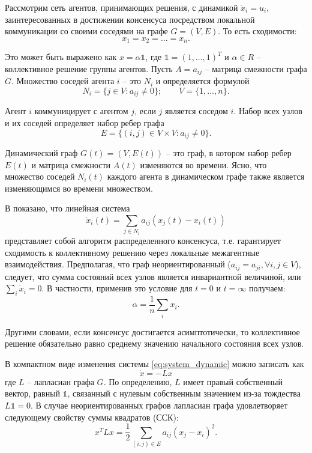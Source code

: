 \documentclass[a4paper,article,14pt]{extarticle}
\begin{document}
Рассмотрим сеть агентов, принимающих решения, с динамикой $\dot x_i = u_i$, заинтересованных в достижении консенсуса посредством локальной коммуникации со своими соседями на графе $G = (V, E)$.
То есть сходимости:
\begin{equation}
x_1 = x_2 = \ldots = x_n.
\end{equation}

Это может быть выражено как $x = \alpha \mathds{1} $, где $\mathds{1} = (1, \ldots, 1)^T$ и $\alpha \in R$ -- коллективное решение группы агентов. Пусть $A = a_{ij}$ -- матрица смежности графа $G$. Множество соседей агента $i$ -- это $N_i$ и определяется формулой
\begin{equation}
N_i = \{ j \in V: a_{ij} \ne 0 \}; \quad \quad V = \{1, \ldots, n\}.
\end{equation}

Агент $i$ коммуницирует с агентом $j$, если $j$ является соседом $i$. Набор всех узлов и их соседей определяет набор ребер графа
\begin{equation}
E = \{ (i,j) \in V\times V: a_{ij} \ne 0\}.
\end{equation}

Динамический граф $G(t) = (V, E(t))$ -- это граф, в котором набор ребер $E(t)$ и матрица смежности $A(t)$ изменяются во времени. Ясно, что множество соседей $N_i(t)$ каждого агента в динамическом графе также является изменяющимся во времени множеством.

В \cite{consensus_basics_2} показано, что линейная система
\begin{equation} \label{eq:system_dynamic}
\dot x_i(t) = \sum_{j \in N_i} a_{ij}(x_j(t)-x_i(t))
\end{equation}
представляет собой алгоритм распределенного консенсуса, т.е. гарантирует сходимость к коллективному решению через локальные межагентные взаимодействия. Предполагая, что граф неориентированный ($a_{ij}=a_{ji}, \forall i,j \in V$), следует, что сумма состояний всех узлов является инвариантной величиной, или $\sum_i \dot x_i = 0$. В частности, применив это условие для $t = 0 \text{ и } t = \infty$ получаем:
\begin{equation}
\alpha = \frac{1}{n}\sum_i x_i.
\end{equation}

Другими словами, если консенсус достигается асимптотически, то коллективное решение обязательно равно среднему значению начального состояния всех узлов.

В компактном виде изменения системы \ref{eq:system_dynamic} можно записать как
\begin{equation}
\dot x = -Lx
\end{equation}
где $L$ -- лапласиан графа $G$. По определению, $L$ имеет правый собственный вектор, равный $\mathds{1}$, связанный с нулевым собственным значением из-за тождества $L\mathds{1} = 0$. В случае неориентированных графов лапласиан графа удовлетворяет следующему свойству суммы квадратов (ССК):
\begin{equation} \label{eq:sos}
x^TLx = \frac{1}{2}\sum_{(i, j) \in E} a_{ij}(x_j-x_i)^2.
\end{equation}
\end{document}
